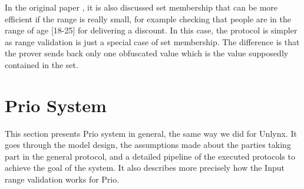 \documentclass{article}
\begin{document}
In the original paper \cite{range}, it is also discussed set membership that can be more efficient if the range is really small, for example checking that people are in the range of age [18-25] for delivering a discount.
In this case, the protocol is simpler as range validation is just a special case of set membership. The difference is that the prover sends back only one obfuscated value which is the value supposedly contained in the set.

\section{Prio System}
This section presents Prio system in general, the same way we did for Unlynx. It goes through the model design, the assumptions made about the parties taking part in the general protocol, and a detailed pipeline of the executed protocols to achieve the goal of the system. It also describes more precisely how the Input range validation works for Prio.\\
\end{document}
